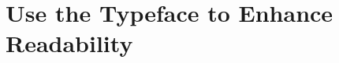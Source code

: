 \documentclass[aspectratio=169]{beamer}
\begin{document}
    
        

        


\section{Use the \textbf{Typeface} to Enhance Readability}

\begin{frame}
\end{frame}
\end{document}

